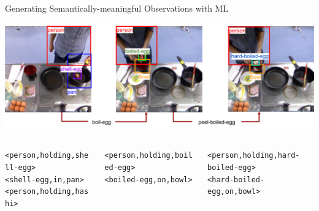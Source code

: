 \documentclass[usenames,dvipsnames]{beamer}
\begin{document}
\begin{frame}[c]{Generating Semantically-meaningful Observations with ML}
	\begin{center}
		\includegraphics[width=\textwidth]{fig/computer-vision-transition-boiled-egg.pdf}
	\end{center}
	\begin{columns}
		\begin{column}{.3\linewidth}
			\tiny
			\texttt{<{\color{red}person},{\color{black}holding},{\color{purple}shell-egg}>}\\
			\texttt{<{\color{Magenta}shell-egg},{\color{black}in},{\color{blue}pan}>}\\
			\texttt{<{\color{red}person},{\color{black}holding},{\color{black}hashi}>}\\
		\end{column}
		\begin{column}{.3\linewidth}
			\tiny
			\texttt{<{\color{red}person},{\color{black}holding},{\color{OliveGreen}boiled-egg}>}\\
			\texttt{<{\color{OliveGreen}boiled-egg},{\color{black}on},{\color{orange}bowl}>}
		\end{column}
		\begin{column}{.3\linewidth}
			\tiny
			\texttt{<{\color{red}person},{\color{black}holding},{\color{blue}hard-boiled-egg}>}\\
			\texttt{<{\color{OliveGreen}hard-boiled-egg},{\color{black}on},{\color{orange}bowl}>}
		\end{column}
	\end{columns}
\end{frame}
\end{document}
